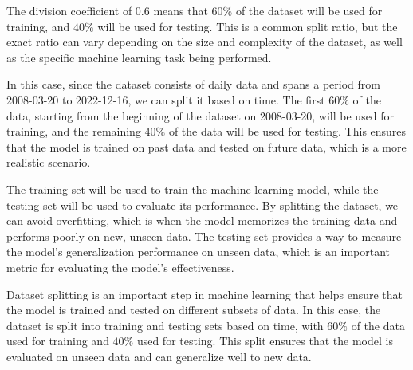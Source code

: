 \documentclass[../xlapes02]{subfiles}
\begin{document}
    The division coefficient of $0.6$ means that $60\%$ of the dataset will be used for training, and $40\%$ will be used for testing. This is a common split ratio, but the exact ratio can vary depending on the size and complexity of the dataset, as well as the specific machine learning task being performed.

    In this case, since the dataset consists of daily data and spans a period from 2008-03-20 to 2022-12-16, we can split it based on time. The first $60\%$ of the data, starting from the beginning of the dataset on 2008-03-20, will be used for training, and the remaining $40\%$ of the data will be used for testing. This ensures that the model is trained on past data and tested on future data, which is a more realistic scenario.

    The training set will be used to train the machine learning model, while the testing set will be used to evaluate its performance. By splitting the dataset, we can avoid overfitting, which is when the model memorizes the training data and performs poorly on new, unseen data. The testing set provides a way to measure the model's generalization performance on unseen data, which is an important metric for evaluating the model's effectiveness.

    Dataset splitting is an important step in machine learning that helps ensure that the model is trained and tested on different subsets of data. In this case, the dataset is split into training and testing sets based on time, with $60\%$ of the data used for training and $40\%$ used for testing. This split ensures that the model is evaluated on unseen data and can generalize well to new data.
\end{document}
